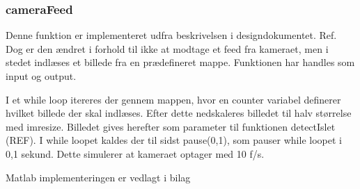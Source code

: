 \subsubsection{cameraFeed}
Denne funktion er implementeret udfra beskrivelsen i designdokumentet. Ref. Dog er den ændret i forhold til ikke at modtage et feed fra kameraet, men i stedet indlæses et billede fra en prædefineret mappe. 
Funktionen har handles som input og output. 

I et while loop itereres der gennem mappen, hvor en counter variabel definerer hvilket billede der skal indlæses. Efter dette nedskaleres billedet til halv størrelse med imresize. Billedet gives herefter som parameter til funktionen detectIslet (REF). I while loopet kaldes der til sidst pause(0,1), som pauser while loopet i 0,1 sekund. Dette simulerer at kameraet optager med 10 f/s. 

Matlab implementeringen er vedlagt i bilag 